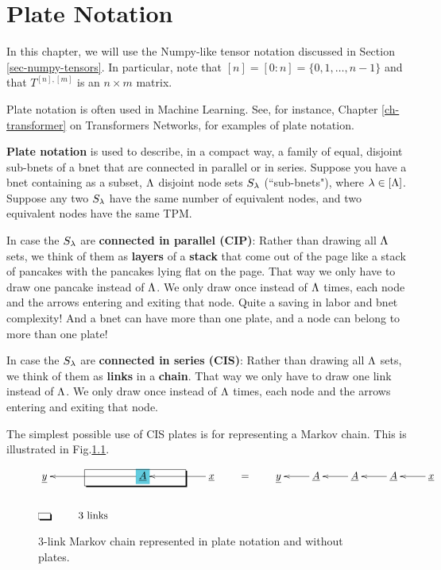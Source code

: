 \chapter{Plate Notation}
\label{ch-plates}

In this chapter, we
will use the Numpy-like tensor notation
discussed in Section 
\ref{sec-numpy-tensors}. In particular, note that $[n] = [0:n] = \{0, 1,\ldots, n-1\}$ and that $T^{[n], [m]}$ is an $n\times m$ matrix.

Plate notation is often used in Machine Learning. See, for instance,
Chapter \ref{ch-transformer} on Transformers Networks, for  examples of plate notation.


{\bf Plate notation} is used to describe, in a compact way, a family of 
equal, disjoint  sub-bnets of a bnet that are connected in parallel or in series.
Suppose you have a bnet containing as a subset, $\Lambda$ disjoint node sets $S_\lambda$ (``sub-bnets"), where
$\lambda\in [\Lambda]$. Suppose
any two $S_\lambda$ have the same number of equivalent nodes,
and two equivalent nodes have the same TPM.

In case the $S_\lambda$ are {\bf connected in parallel (CIP)}:
Rather than drawing all $\Lambda$ sets, 
we think of them as {\bf layers} of a {\bf stack}
that come out of the page like a stack of pancakes with the pancakes
lying flat on the page.
That way we only have to draw one pancake instead of $\Lambda$.
We only draw once instead of $\Lambda$ times, each node and the arrows entering and exiting
that node. Quite a saving in labor and bnet complexity! 
And a bnet can have more 
than one plate, and a node can belong
to more than one plate!

In case the $S_\lambda$ are {\bf connected in series (CIS)}: Rather than drawing all $\Lambda$ sets, 
we think of them as {\bf links} in a {\bf chain}.
That way we only have to draw one link instead of $\Lambda$.
We only draw once instead of $\Lambda$ times, each node and the arrows entering and exiting
that node. 


The simplest possible use
of CIS plates is for representing
a Markov chain. This is
illustrated in  Fig.\ref{fig-texnn-for-markov}.
\begin{figure}[h!]\centering
$$\xymatrix{
{\underline{y}}&&*+[F*:SkyBlue]{\underline{A}}\ar[ll]&&{\underline{x}}\ar[ll]
\save
\POS"1,2"."1,2"."1,4"."1,4"!C*+<1.0em>\frm{-,}
\restore
\\
*+[F-,]{\;\;}&\text{3 links}
} \quad\quad=\quad\quad \xymatrix{\rvy & \rvA\ar[l] &\rvA\ar[l] &\rvA\ar[l] & \rvx\ar[l]}$$
\caption{3-link Markov chain represented in plate notation
and without plates.}
\label{fig-texnn-for-markov}
\end{figure}


